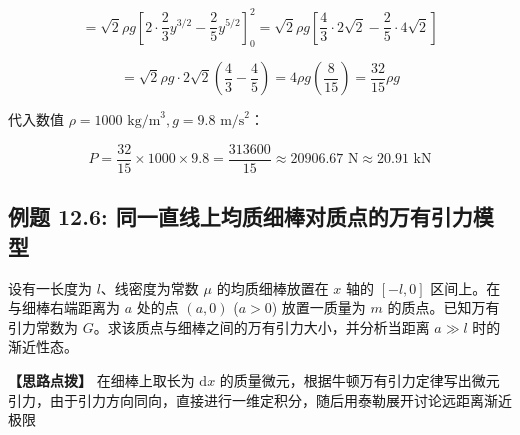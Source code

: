 \documentclass[11pt,a4paper,UTF8]{ctexart}
\begin{document}
\begin{solbox}[分步推导与答题规范]
\begin{equation*}
= \sqrt{2}\rho g \left[2 \cdot \frac{2}{3}y^{3/2} - \frac{2}{5}y^{5/2}\right]_0^2 = \sqrt{2}\rho g \left[\frac{4}{3} \cdot 2\sqrt{2} - \frac{2}{5} \cdot 4\sqrt{2}\right]
\end{equation*}



\begin{equation*}
= \sqrt{2}\rho g \cdot 2\sqrt{2} \left(\frac{4}{3} - \frac{4}{5}\right) = 4\rho g \left(\frac{8}{15}\right) = \frac{32}{15}\rho g
\end{equation*}


代入数值 $\rho = 1000\text{ kg/m}^3, g = 9.8\text{ m/s}^2$：


\begin{equation*}
P = \frac{32}{15} \times 1000 \times 9.8 = \frac{313600}{15} \approx 20906.67\text{ N} \approx 20.91\text{ kN}
\end{equation*}

\end{solbox}


\subsection{例题 12.6: 同一直线上均质细棒对质点的万有引力模型}

设有一长度为 $l$、线密度为常数 $\mu$ 的均质细棒放置在 $x$ 轴的 $[-l, 0]$ 区间上。在与细棒右端距离为 $a$ 处的点 $(a, 0)$ ($a > 0$) 放置一质量为 $m$ 的质点。已知万有引力常数为 $G$。求该质点与细棒之间的万有引力大小，并分析当距离 $a \gg l$ 时的渐近性态。

\textbf{\color{DeepPurple}【思路点拨】} 在细棒上取长为 $\mathrm{d}x$ 的质量微元，根据牛顿万有引力定律写出微元引力，由于引力方向同向，直接进行一维定积分，随后用泰勒展开讨论远距离渐近极限
\end{document}

